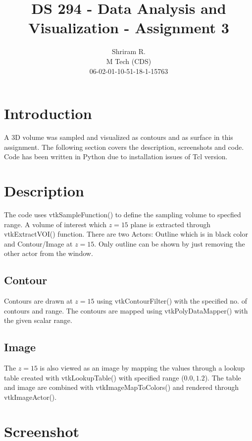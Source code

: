 \documentclass[11pt,a4paper,oneside]{article}
\begin{document}
	\title{DS 294 - Data Analysis and Visualization - Assignment 3}
	\author{Shriram R. \\ M Tech (CDS) \\ 06-02-01-10-51-18-1-15763}
	\maketitle	
	
	\section{Introduction}
	A 3D volume was sampled and visualized as contours and as surface in this assignment. The following section covers the description, screenshots and code. Code has been written in Python due to installation issues of Tcl version.
	
	\section{Description}
	
	The code uses vtkSampleFunction() to define the sampling volume to specfied range. A volume of interest which $z=15$ plane is extracted through vtkExtractVOI() function. There are two Actors: Outline which is in black color and Contour/Image at $z = 15$. Only outline can be shown by just removing the other actor from the window.
	
	\subsection{Contour}
	Contours are drawn at $z = 15$ using vtkContourFilter() with the specified no. of contours and range. The contours are mapped using vtkPolyDataMapper() with the given scalar range.
	
	\subsection{Image}
	The $z=15$ is also viewed as an image by mapping the values through a lookup table created with vtkLookupTable() with specified range ($0.0, 1.2$). The table and image are combined with vtkImageMapToColors() and rendered through vtkImageActor().
	
	\section{Screenshot}	
		
\end{document}
